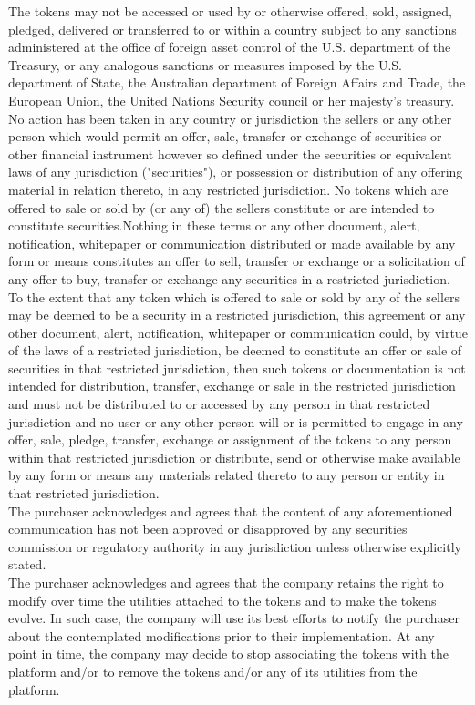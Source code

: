 ﻿\documentclass[a4paper]{article}
\begin{document}
The tokens may not be accessed or used by or otherwise offered, sold, assigned, pledged, delivered or transferred to or within a country subject to any sanctions administered at the office of foreign asset control of the U.S. department of the Treasury, or any analogous sanctions or measures imposed by the U.S. department of State, the Australian department of Foreign Affairs and Trade, the European Union, the United Nations Security council or her majesty's treasury. \\

No action has been taken in any country or jurisdiction the sellers or any other person which would permit an offer, sale, transfer or exchange of securities or other financial instrument however so defined under the securities or equivalent laws of any jurisdiction ("securities"), or possession or distribution of any offering material in relation thereto, in any restricted jurisdiction. No tokens which are offered to sale or sold by (or any of) the sellers constitute or are intended to constitute securities.Nothing in these terms or any other document, alert, notification, whitepaper or communication distributed or made available by any form or means constitutes an offer to sell, transfer or exchange or a solicitation of any offer to buy, transfer or exchange any securities in a restricted jurisdiction. \\

To the extent that any token which is offered to sale or sold by any of the sellers may be deemed to be a security in a restricted jurisdiction, this agreement or any other document, alert, notification, whitepaper or communication could, by virtue of the laws of a restricted jurisdiction, be deemed to constitute an offer or sale of securities in that restricted jurisdiction, then such tokens or documentation is not intended for distribution, transfer, exchange or sale in the restricted jurisdiction and must not be distributed to or accessed by any person in that restricted jurisdiction and no user or any other person will or is permitted to engage in any offer, sale, pledge, transfer, exchange or assignment of the tokens to any person within that restricted jurisdiction or distribute, send or otherwise make available by any form or means any materials related thereto to any person or entity in that restricted jurisdiction. \\

The purchaser acknowledges and agrees that the content of any aforementioned communication has not been approved or disapproved by any securities commission or regulatory authority in any jurisdiction unless otherwise explicitly stated. \\

The purchaser acknowledges and agrees that the company retains the right to modify over time the utilities attached to the tokens and to make the tokens evolve. In such case, the company will use its best efforts to notify the purchaser about the contemplated modifications prior to their implementation. At any point in time, the company may decide to stop associating the tokens with the platform and/or to remove the tokens and/or any of its utilities from the platform.
\end{document}
